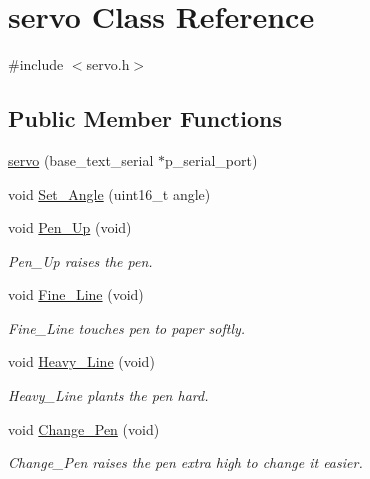 \hypertarget{classservo}{\section{servo Class Reference}
\label{classservo}
}


{\ttfamily \#include $<$servo.\-h$>$}

\subsection*{Public Member Functions}
\begin{DoxyCompactItemize}
\item 
\hyperlink{classservo_a7b755565320b23fbbb6f503592576451}{servo} (base\-\_\-text\-\_\-serial $\ast$p\-\_\-serial\-\_\-port)
\item 
void \hyperlink{classservo_a0c3ccbb231e64ef9d4d594b6a257fede}{Set\-\_\-\-Angle} (uint16\-\_\-t angle)
\item 
\hypertarget{classservo_a0f6663b0fba3ed965886d1b7b2c096ff}{void \hyperlink{classservo_a0f6663b0fba3ed965886d1b7b2c096ff}{Pen\-\_\-\-Up} (void)}\label{classservo_a0f6663b0fba3ed965886d1b7b2c096ff}

\begin{DoxyCompactList}\small\item\em Pen\-\_\-\-Up raises the pen. \end{DoxyCompactList}\item 
\hypertarget{classservo_aa896489169396a9627cf91a69866c314}{void \hyperlink{classservo_aa896489169396a9627cf91a69866c314}{Fine\-\_\-\-Line} (void)}\label{classservo_aa896489169396a9627cf91a69866c314}

\begin{DoxyCompactList}\small\item\em Fine\-\_\-\-Line touches pen to paper softly. \end{DoxyCompactList}\item 
\hypertarget{classservo_a0fdfeb3b032f684bf02e1d8c2f631a89}{void \hyperlink{classservo_a0fdfeb3b032f684bf02e1d8c2f631a89}{Heavy\-\_\-\-Line} (void)}\label{classservo_a0fdfeb3b032f684bf02e1d8c2f631a89}

\begin{DoxyCompactList}\small\item\em Heavy\-\_\-\-Line plants the pen hard. \end{DoxyCompactList}\item 
\hypertarget{classservo_abf07bb1d2a9a8cbadcabf3f12da09ffc}{void \hyperlink{classservo_abf07bb1d2a9a8cbadcabf3f12da09ffc}{Change\-\_\-\-Pen} (void)}\label{classservo_abf07bb1d2a9a8cbadcabf3f12da09ffc}

\begin{DoxyCompactList}\small\item\em Change\-\_\-\-Pen raises the pen extra high to change it easier. \end{DoxyCompactList}\end{DoxyCompactItemize}
